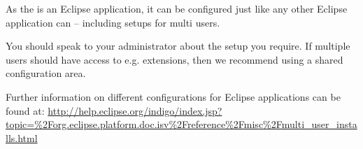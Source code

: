 As the \ite{} is an Eclipse application, it can be configured just like any other Eclipse application can -- including setups for multi users. 

You should speak to your administrator about the setup you require. If multiple users should have access to e.g. extensions, then we recommend using a shared configuration area. 

Further information on different configurations for Eclipse applications can be found at:
\url{http://help.eclipse.org/indigo/index.jsp?topic=\%2Forg.eclipse.platform.doc.isv\%2Freference\%2Fmisc\%2Fmulti_user_installs.html}
